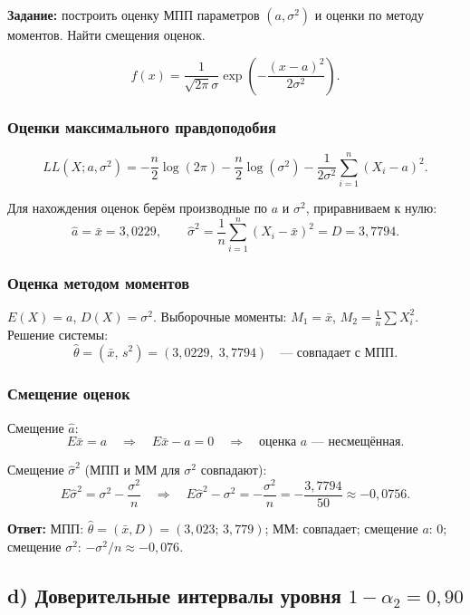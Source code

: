 \documentclass[12pt,a4paper]{article}
\newcommand{\ahat}{\hat{a}}
\newcommand{\xbar}{\bar{x}}
\begin{document}
	\textbf{Задание:} построить оценку МПП параметров $(a,\sigma^2)$ и оценки по
	методу моментов. Найти смещения оценок.
	
	\[
	f(x) = \frac{1}{\sqrt{2\pi}\sigma}\exp\!\left(-\frac{(x-a)^2}{2\sigma^2}\right).
	\]
	
	\subsubsection*{Оценки максимального правдоподобия}
	
	\[
	LL(X;a,\sigma^2) = -\frac{n}{2}\log(2\pi) - \frac{n}{2}\log(\sigma^2)
	- \frac{1}{2\sigma^2}\sum_{i=1}^n(X_i-a)^2.
	\]
	
	Для нахождения оценок берём производные по $a$ и $\sigma^2$,
	приравниваем к нулю:
	\[
	\ahat = \xbar = 3{,}0229,\qquad
	\hat\sigma^2 = \frac{1}{n}\sum_{i=1}^n(X_i-\xbar)^2 = D = 3{,}7794.
	\]
	
	\subsubsection*{Оценка методом моментов}
	
	$E(X)=a$, $D(X)=\sigma^2$. Выборочные моменты: $M_1=\xbar$, $M_2 = \frac{1}{n}\sum X_i^2$.
	Решение системы:
	\[
	\hat\theta = (\xbar,\, s^2) = (3{,}0229,\; 3{,}7794) \quad \text{--- совпадает с МПП.}
	\]
	
	\subsubsection*{Смещение оценок}
	
	Смещение $\ahat$:
	\[
	E\xbar = a \quad\Rightarrow\quad E\xbar - a = 0
	\quad \Rightarrow\quad \text{оценка $a$ --- несмещённая.}
	\]
	
	Смещение $\hat\sigma^2$ (МПП и ММ для $\sigma^2$ совпадают):
	\[
	E\hat\sigma^2 = \sigma^2 - \frac{\sigma^2}{n}
	\quad\Rightarrow\quad
	E\hat\sigma^2 - \sigma^2 = -\frac{\sigma^2}{n} = -\frac{3{,}7794}{50} \approx -0{,}0756.
	\]
	
	\textbf{Ответ:} МПП: $\hat\theta=(\xbar,D)=(3{,}023;\,3{,}779)$;
	ММ: совпадает; смещение $a$: $0$; смещение $\sigma^2$: $-\sigma^2/n\approx-0{,}076$.
	
	\subsection{d) Доверительные интервалы уровня \texorpdfstring{$1-\alpha_2=0{,}90$}{0.90}}
	
\end{document}
